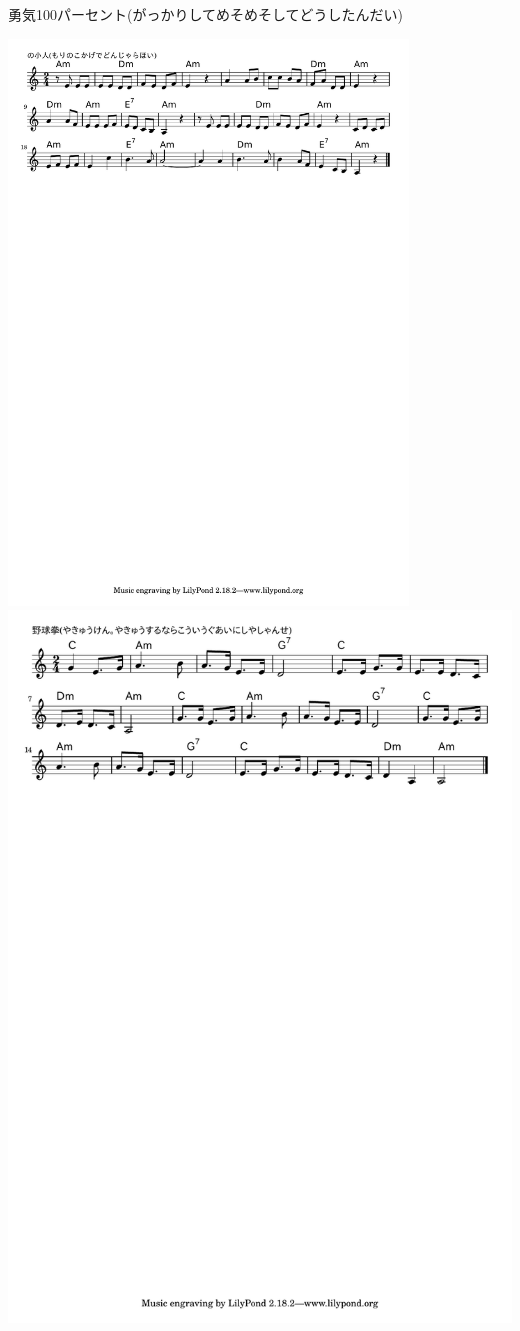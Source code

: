 \documentclass[a4paper]{ltjsarticle}
\begin{document}
勇気100パーセント(がっかりしてめそめそしてどうしたんだい)

\includegraphics[height=150mm]{morinokobito.pdf}
\includegraphics{yakyuken.pdf}
\end{document}
